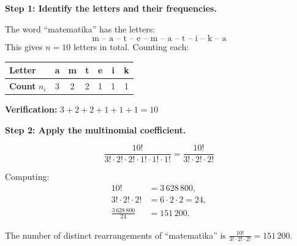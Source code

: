 \documentclass[12pt, a4paper]{article}
\begin{document}
\textbf{Step 1: Identify the letters and their frequencies.}

The word ``matematika'' has the letters:
\[
  \text{m -- a -- t -- e -- m -- a -- t -- i -- k -- a}
\]
This gives $n = 10$ letters in total. Counting each:

\begin{center}
\end{center}

\begin{center}
\renewcommand{\arraystretch}{1.2}
\begin{tabular}{lcccccc}
\toprule
\textbf{Letter} & a & m & t & e & i & k \\
\midrule
\textbf{Count} $n_i$ & 3 & 2 & 2 & 1 & 1 & 1 \\
\bottomrule
\end{tabular}
\end{center}

\textbf{Verification:}\; $3 + 2 + 2 + 1 + 1 + 1 = 10$ \;\checkmark

\medskip
\textbf{Step 2: Apply the multinomial coefficient.}

\[
  \frac{10!}{3!\cdot 2!\cdot 2!\cdot 1!\cdot 1!\cdot 1!}
  = \frac{10!}{3!\cdot 2!\cdot 2!}
\]

Computing:
\begin{align*}
  10! &= 3\,628\,800, \\
  3! \cdot 2! \cdot 2! &= 6 \cdot 2 \cdot 2 = 24, \\[4pt]
  \frac{3\,628\,800}{24} &= 151\,200.
\end{align*}

\begin{answerbox}
\centering
The number of distinct rearrangements of ``matematika'' is
$\displaystyle\frac{10!}{3!\cdot 2!\cdot 2!} = \boxed{151\,200}$.
\end{answerbox}
\end{document}
